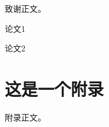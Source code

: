 \documentclass[format=draft,language=chinese,degree=master]{hustthesis}
\begin{document}
\backmatter

\begin{ack}
致谢正文。
\end{ack}




\appendix

\begin{publications}
    \item 论文1
    \item 论文2
\end{publications}

\chapter{这是一个附录}\label{appendix:1}
附录正文。
\end{document}
